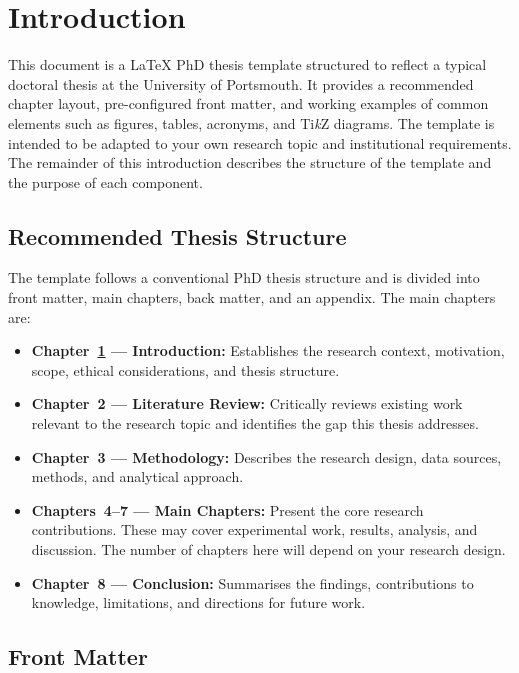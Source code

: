 \chapter{Introduction}
\label{chap:Introduction}

This document is a \LaTeX{} PhD thesis template structured to reflect a typical doctoral thesis at the University of Portsmouth. It provides a recommended chapter layout, pre-configured front matter, and working examples of common elements such as figures, tables, acronyms, and Ti\textit{k}Z diagrams. The template is intended to be adapted to your own research topic and institutional requirements. The remainder of this introduction describes the structure of the template and the purpose of each component.


\section{Recommended Thesis Structure}
\label{sec:structure}

The template follows a conventional PhD thesis structure and is divided into front matter, main chapters, back matter, and an appendix. The main chapters are:

\begin{itemize}
    \item \textbf{Chapter~\ref{chap:Introduction} --- Introduction:} Establishes the research context, motivation, scope, ethical considerations, and thesis structure.
    \item \textbf{Chapter~2 --- Literature Review:} Critically reviews existing work relevant to the research topic and identifies the gap this thesis addresses.
    \item \textbf{Chapter~3 --- Methodology:} Describes the research design, data sources, methods, and analytical approach.
    \item \textbf{Chapters~4--7 --- Main Chapters:} Present the core research contributions. These may cover experimental work, results, analysis, and discussion. The number of chapters here will depend on your research design.
    \item \textbf{Chapter~8 --- Conclusion:} Summarises the findings, contributions to knowledge, limitations, and directions for future work.
\end{itemize}


\section{Front Matter}
\label{sec:frontmatter}


